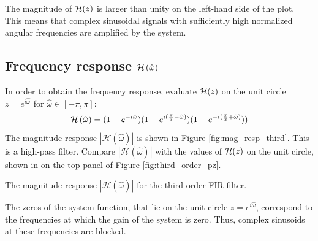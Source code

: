 The magnitude of $\mathcal{H}(z)$ is larger than unity on the left-hand side of
the plot. This means that complex sinusoidal signals with sufficiently
high normalized angular frequencies are amplified by the system.




\subsection{Frequency response $\mathcal{H}\left(\hat{\omega}\right)$}

In order to obtain the frequency response, evaluate $\mathcal{H}(z)$ on the unit
circle $z=e^{i\hat{\omega}}$ for $\hat{\omega}\in[-\pi,\pi]$:
\begin{equation}
\mathcal{H}\left(\hat{\omega}\right) = (1-e^{-i\hat{\omega}})(1-e^{i(\frac{\pi}{3}-\hat{\omega})})(1-e^{-i(\frac{\pi}{3}+\hat{\omega})}) )
\end{equation}
The magnitude response $|\mathcal{H}(\hat{\omega})|$ is shown in Figure
\ref{fig:mag_resp_third}. This is a high-pass filter. Compare
$|\mathcal{H}(\hat{\omega})|$ with the values of $\mathcal{H}(z)$ on the unit
circle, shown in on the top panel of Figure \ref{fig:third_order_pz}.


\begin{marginfigure}
\begin{center}
\end{center}
\caption{The magnitude response $|\mathcal{H}(\hat{\omega})|$ for the third order FIR filter.}
\label{fig:mag_resp_third}
\end{marginfigure}

The zeros of the system function, that lie on the unit circle $z=e^{i\hat{\omega}}$, correspond to the frequencies at which the gain of the system is zero. Thus, complex sinusoids at these frequencies are blocked. 


